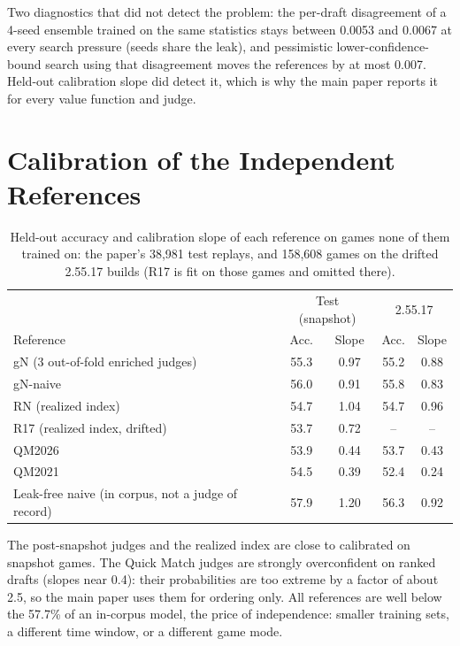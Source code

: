 \documentclass[journal]{IEEEtran}
\newcommand{\added}[1]{{\color{blue}#1}}
\newcommand{\added}[1]{#1}
\begin{document}
\added{Two diagnostics that did not detect the problem: the per-draft disagreement of a 4-seed ensemble trained on the same statistics stays between 0.0053 and 0.0067 at every search pressure (seeds share the leak), and pessimistic lower-confidence-bound search using that disagreement moves the references by at most 0.007. Held-out calibration slope did detect it, which is why the main paper reports it for every value function and judge.}

\section{\added{Calibration of the Independent References}}
\label{sec:refcal}

\begin{table}[t]
\centering
\caption{\added{Held-out accuracy and calibration slope of each reference on games none of them trained on: the paper's 38,981 test replays, and 158,608 games on the drifted 2.55.17 builds (R17 is fit on those games and omitted there).}}
\label{tab:refcal}
\setlength{\tabcolsep}{4pt}
\begin{tabular}{lcccc}
\toprule
& \multicolumn{2}{c}{Test (snapshot)} & \multicolumn{2}{c}{2.55.17} \\
Reference & Acc. & Slope & Acc. & Slope \\
\midrule
gN (3 out-of-fold enriched judges) & 55.3 & 0.97 & 55.2 & 0.88 \\
gN-naive & 56.0 & 0.91 & 55.8 & 0.83 \\
RN (realized index) & 54.7 & 1.04 & 54.7 & 0.96 \\
R17 (realized index, drifted) & 53.7 & 0.72 & -- & -- \\
QM2026 & 53.9 & 0.44 & 53.7 & 0.43 \\
QM2021 & 54.5 & 0.39 & 52.4 & 0.24 \\
\midrule
Leak-free naive (in corpus, not a judge of record) & 57.9 & 1.20 & 56.3 & 0.92 \\
\bottomrule
\end{tabular}
\end{table}

\added{The post-snapshot judges and the realized index are close to calibrated on snapshot games. The Quick Match judges are strongly overconfident on ranked drafts (slopes near 0.4): their probabilities are too extreme by a factor of about 2.5, so the main paper uses them for ordering only. All references are well below the 57.7\% of an in-corpus model, the price of independence: smaller training sets, a different time window, or a different game mode.}
\end{document}
